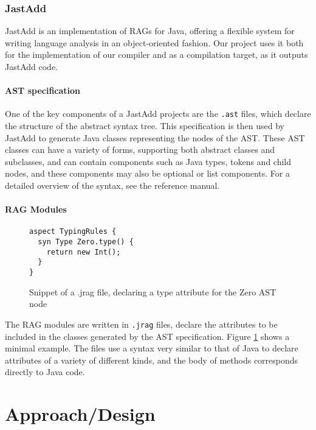 \documentclass[nofilelist]{cslthse-msc}
\newcommand{\CR}[1]{\textcolor{green!60!black}{[\textbf{CR}:#1]}}
\begin{document}
\subsection{JastAdd}
JastAdd is an implementation of RAGs for Java, offering a flexible system for writing language analysis in an object-oriented fashion.\cite{JastAdd}
Our project uses it both for the implementation of our compiler and as a compilation target, as it outputs JastAdd code.

\subsubsection{AST specification}\label{astdef}
One of the key components of a JastAdd projects are the \lstinline{.ast} files, which declare the structure of the abstract syntax tree.
This specification is then used by JastAdd to generate Java classes representing the nodes of the AST.
These AST classes can have a variety of forms, supporting both abstract classes and subclasses, and can contain components such as Java types, tokens and child nodes, and these components may also be optional or list components.
For a detailed overview of the syntax, see the reference manual\cite{jastaddref}.

\subsubsection{RAG Modules}
\begin{figure}[h]
\begin{lstlisting}[language=jrag]
aspect TypingRules {
  syn Type Zero.type() {
    return new Int();
  }
}
\end{lstlisting}
  \caption{Snippet of a .jrag file, declaring a type attribute for the Zero AST node}
  \label{jragexample}
\end{figure}
The RAG modules are written in \lstinline{.jrag} files, declare the attributes to be included in the classes generated by the AST specification.
Figure \ref{jragexample} shows a minimal example.
The files use a syntax very similar to that of Java to declare attributes of a variety of different kinds, and the body of methods corresponds directly to Java code.

\chapter{Approach/Design} %
\end{document}
